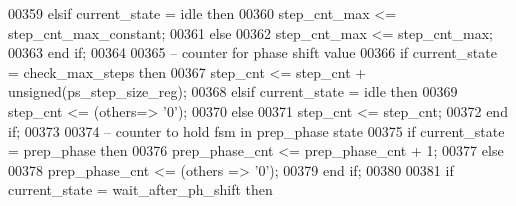 \begin{DoxyCode}
00359       \textcolor{keywordflow}{elsif} \textcolor{vhdlchar}{current_state} \textcolor{vhdlchar}{=} \textcolor{vhdlchar}{idle} \textcolor{keywordflow}{then} 
00360          \textcolor{vhdlchar}{step_cnt_max} \textcolor{vhdlchar}{<=} \textcolor{vhdlchar}{step_cnt_max_constant};
00361       \textcolor{keywordflow}{else} 
00362          \textcolor{vhdlchar}{step_cnt_max} \textcolor{vhdlchar}{<=} \textcolor{vhdlchar}{step_cnt_max};
00363       \textcolor{keywordflow}{end} \textcolor{keywordflow}{if};
00364       
00365 \textcolor{keyword}{      -- counter for phase shift value}
00366       \textcolor{keywordflow}{if} \textcolor{vhdlchar}{current_state} \textcolor{vhdlchar}{=} \textcolor{vhdlchar}{check\_max\_steps} \textcolor{keywordflow}{then} 
00367          \textcolor{vhdlchar}{step_cnt} \textcolor{vhdlchar}{<=} \textcolor{vhdlchar}{step_cnt} \textcolor{vhdlchar}{+} \textcolor{comment}{unsigned}\textcolor{vhdlchar}{(}\textcolor{vhdlchar}{ps_step_size_reg}\textcolor{vhdlchar}{)};
00368       \textcolor{keywordflow}{elsif} \textcolor{vhdlchar}{current_state} \textcolor{vhdlchar}{=} \textcolor{vhdlchar}{idle} \textcolor{keywordflow}{then} 
00369          \textcolor{vhdlchar}{step_cnt} \textcolor{vhdlchar}{<=} \textcolor{vhdlchar}{(}\textcolor{keywordflow}{others}\textcolor{vhdlchar}{=}\textcolor{vhdlchar}{>} \textcolor{vhdlchar}{'}\textcolor{vhdllogic}{}\textcolor{vhdllogic}{0}\textcolor{vhdlchar}{'}\textcolor{vhdlchar}{)};
00370       \textcolor{keywordflow}{else} 
00371          \textcolor{vhdlchar}{step_cnt} \textcolor{vhdlchar}{<=} \textcolor{vhdlchar}{step_cnt};
00372       \textcolor{keywordflow}{end} \textcolor{keywordflow}{if};
00373       
00374 \textcolor{keyword}{      -- counter to hold fsm in prep\_phase state}
00375       \textcolor{keywordflow}{if} \textcolor{vhdlchar}{current_state} \textcolor{vhdlchar}{=} \textcolor{vhdlchar}{prep\_phase} \textcolor{keywordflow}{then} 
00376          \textcolor{vhdlchar}{prep_phase_cnt} \textcolor{vhdlchar}{<=} \textcolor{vhdlchar}{prep_phase_cnt} \textcolor{vhdlchar}{+} \textcolor{vhdllogic}{}\textcolor{vhdllogic}{1};
00377       \textcolor{keywordflow}{else} 
00378          \textcolor{vhdlchar}{prep_phase_cnt} \textcolor{vhdlchar}{<=} \textcolor{vhdlchar}{(}\textcolor{keywordflow}{others} \textcolor{vhdlchar}{=}\textcolor{vhdlchar}{>} \textcolor{vhdlchar}{'}\textcolor{vhdllogic}{}\textcolor{vhdllogic}{0}\textcolor{vhdlchar}{'}\textcolor{vhdlchar}{)};
00379       \textcolor{keywordflow}{end} \textcolor{keywordflow}{if};
00380       
00381       \textcolor{keywordflow}{if} \textcolor{vhdlchar}{current_state} \textcolor{vhdlchar}{=} \textcolor{vhdlchar}{wait\_after\_ph\_shift} \textcolor{keywordflow}{then} 

\end{DoxyCode}
